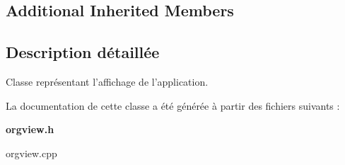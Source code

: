 \subsection*{Additional Inherited Members}


\subsection{Description détaillée}
Classe représentant l'affichage de l'application. 

La documentation de cette classe a été générée à partir des fichiers suivants \-:\begin{DoxyCompactItemize}
\item 
{\bf orgview.\-h}\item 
orgview.\-cpp\end{DoxyCompactItemize}
